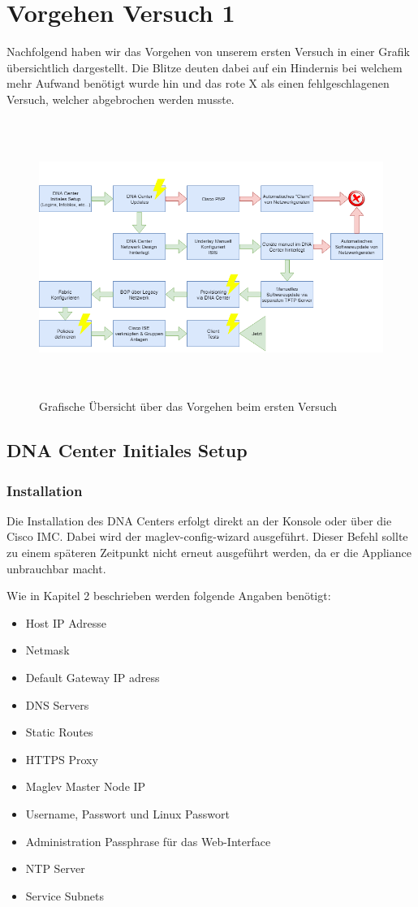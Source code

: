 \section{Vorgehen Versuch 1}
Nachfolgend haben wir das Vorgehen von unserem ersten Versuch in einer Grafik übersichtlich dargestellt. Die Blitze deuten dabei auf ein Hindernis bei welchem mehr Aufwand benötigt wurde hin und das rote X als einen fehlgeschlagenen Versuch, welcher abgebrochen werden musste.
\begin{figure}[H]
	\centering
	\includegraphics[height=9cm]{img/vorgehen.png}
	\caption{Grafische Übersicht über das Vorgehen beim ersten Versuch}
	\label{fig:vorgehen}
\end{figure} 

\subsection{DNA Center Initiales Setup}

\subsubsection{Installation}
\label{DNACenterSetup_Installation}
Die Installation des DNA Centers erfolgt direkt an der Konsole oder über die Cisco IMC. Dabei wird der maglev-config-wizard ausgeführt. Dieser Befehl sollte zu einem späteren Zeitpunkt nicht erneut ausgeführt werden, da er die Appliance unbrauchbar macht. 

Wie in Kapitel 2\cite{cisco-dna-installation-guide} beschrieben werden folgende Angaben benötigt:
\begin{itemize}
	\item Host IP Adresse
	\item Netmask
	\item Default Gateway IP adress
	\item DNS Servers
	\item Static Routes
	\item HTTPS Proxy
	\item Maglev Master Node IP
	\item Username, Passwort und Linux Passwort
	\item Administration Passphrase für das Web-Interface
	\item NTP Server
	\item Service Subnets
\end{itemize}

